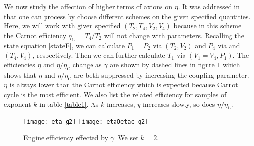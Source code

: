 \documentclass[preprint,showpacs,showkeys,onecolumn,nofootinbib]{revtex4}
\begin{document}
 We now study the affection of higher terms of axions on $\eta$. It was addressed in \cite{Johnson:2014yja} that one can process by choose different schemes on the given specified quantities. Here, we will work with given specified $(T_2,T_4,V_2,V_4)$ because in this scheme the Carnot efficiency $\eta_C=T_4/T_2$ will not change with parameters. Recalling the state equation \eqref{stateE}, we can calculate  $P_1=P_2$ via $(T_2,V_2)$ and $P_4$ via  and  $(T_4,V_4)$, respectively. Then we can further calculate $T_1$ via $(V_1=V_4,P_1)$. The efficiencies $\eta$ and $\eta/\eta_C$ change as $\gamma$  are shown by dashed lines  in figure \ref{fig-eta-g2} which shows that  $\eta$  and $\eta/\eta_C$ are both suppressed by increasing the coupling parameter. $\eta$ is always lower than the Carnot efficiency which is expected because  Carnot cycle is the most efficient. We also list the related efficiency for samples of exponent $k$ in table \ref{table1}. As $k$ increases, $\eta$ increases slowly, so does $\eta/\eta_C$.


%
\begin{figure}[h]
{\centering
\texttt{[image: eta-g2]}\hspace{0.15cm}
\texttt{[image: etaOetac-g2]}
   \caption{Engine efficiency effected by $\gamma$. We set $k=2$. }   \label{fig-eta-g2}}
\end{figure}
\end{document}
